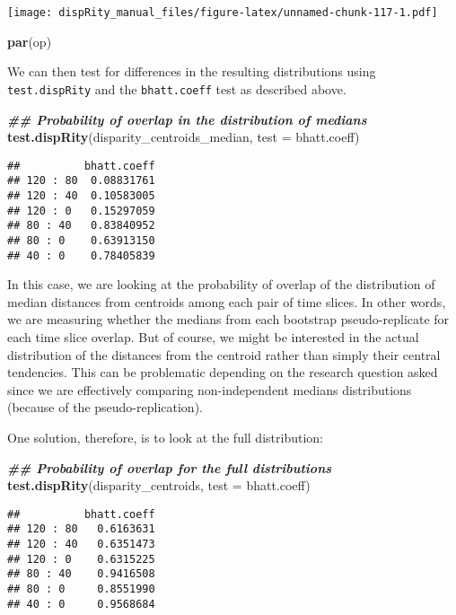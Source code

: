 \documentclass[
]{book}
\newenvironment{Shaded}{\begin{snugshade}}{\end{snugshade}}
\newcommand{\AttributeTok}[1]{\textcolor[rgb]{0.13,0.29,0.53}{#1}}
\newcommand{\DocumentationTok}[1]{\textcolor[rgb]{0.56,0.35,0.01}{\textbf{\textit{#1}}}}
\newcommand{\FunctionTok}[1]{\textcolor[rgb]{0.13,0.29,0.53}{\textbf{#1}}}
\newcommand{\NormalTok}[1]{#1}
\begin{document}
\texttt{[image: dispRity\_manual\_files/figure-latex/unnamed-chunk-117-1.pdf]}

\begin{Shaded}
\begin{Highlighting}[]
\FunctionTok{par}\NormalTok{(op)}
\end{Highlighting}
\end{Shaded}

We can then test for differences in the resulting distributions using \texttt{test.dispRity} and the \texttt{bhatt.coeff} test as described above.

\begin{Shaded}
\begin{Highlighting}[]
\DocumentationTok{\#\# Probability of overlap in the distribution of medians}
\FunctionTok{test.dispRity}\NormalTok{(disparity\_centroids\_median, }\AttributeTok{test =}\NormalTok{ bhatt.coeff)}
\end{Highlighting}
\end{Shaded}

\begin{verbatim}
##          bhatt.coeff
## 120 : 80  0.08831761
## 120 : 40  0.10583005
## 120 : 0   0.15297059
## 80 : 40   0.83840952
## 80 : 0    0.63913150
## 40 : 0    0.78405839
\end{verbatim}

In this case, we are looking at the probability of overlap of the distribution of median distances from centroids among each pair of time slices.
In other words, we are measuring whether the medians from each bootstrap pseudo-replicate for each time slice overlap.
But of course, we might be interested in the actual distribution of the distances from the centroid rather than simply their central tendencies.
This can be problematic depending on the research question asked since we are effectively comparing non-independent medians distributions (because of the pseudo-replication).

One solution, therefore, is to look at the full distribution:

\begin{Shaded}
\begin{Highlighting}[]
\DocumentationTok{\#\# Probability of overlap for the full distributions}
\FunctionTok{test.dispRity}\NormalTok{(disparity\_centroids, }\AttributeTok{test =}\NormalTok{ bhatt.coeff)}
\end{Highlighting}
\end{Shaded}

\begin{verbatim}
##          bhatt.coeff
## 120 : 80   0.6163631
## 120 : 40   0.6351473
## 120 : 0    0.6315225
## 80 : 40    0.9416508
## 80 : 0     0.8551990
## 40 : 0     0.9568684
\end{verbatim}
\end{document}
